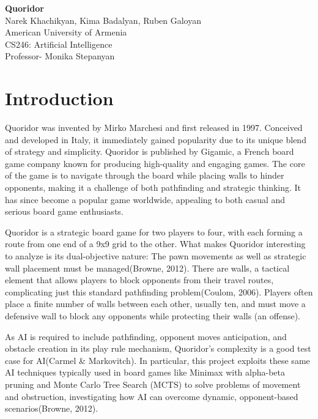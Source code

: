 \documentclass[12pt]{report}
\begin{document}
\onehalfspacing

\begin{titlepage}
\centering
\vspace*{\fill} 
{\Large \textbf{Quoridor}}\\[0.5cm]
{\Large Narek Khachikyan, Kima Badalyan, Ruben Galoyan}\\[0.5cm]
{\large American University of Armenia}\\[0.5cm]
{\large CS246: Artificial Intelligence}\\[0.5cm]
{\large Professor- Monika Stepanyan }
\vspace*{\fill}
\end{titlepage}

\newpage
\tableofcontents
\newpage

\chapter{Introduction}

Quoridor was invented by Mirko Marchesi and first released in 1997. Conceived and developed in Italy, it immediately gained popularity due to its unique blend of strategy and simplicity. Quoridor is published by Gigamic, a French board game company known for producing high-quality and engaging games. The core of the game is to navigate through the board while placing walls to hinder opponents, making it a challenge of both pathfinding and strategic thinking. It has since become a popular game worldwide, appealing to both casual and serious board game enthusiasts.

Quoridor is a strategic board game for two players to four, with each forming a route from one end of a 9x9 grid to the other. What makes Quoridor interesting to analyze is its dual-objective nature: The pawn movements as well as strategic wall placement must be managed(Browne, 2012). There are walls, a tactical element that allows players to block opponents from their travel routes, complicating just this standard pathfinding problem(Coulom, 2006). Players often place a finite number of walls between each other, usually ten, and must move a defensive wall to block any opponents while protecting their walls (an offense). 

As AI is required to include pathfinding, opponent moves anticipation, and obstacle creation in its play rule mechanism, Quoridor’s complexity is a good test case for AI(Carmel \& Markovitch). In particular, this project exploits these same AI techniques typically used in board games like Minimax with alpha-beta pruning and Monte Carlo Tree Search (MCTS) to solve problems of movement and obstruction, investigating how AI can overcome dynamic, opponent-based scenarios(Browne, 2012). 
\end{document}
